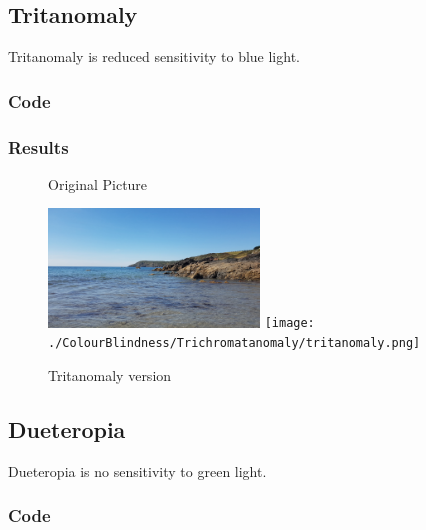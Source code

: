 \documentclass{Report}
\begin{document}
\newpage

\subsection{Tritanomaly}

Tritanomaly is reduced sensitivity to blue light. \autocites{Types}
\subsubsection{Code}


\newpage

\subsubsection{Results}
\begin{figure}[h!]
  \centering
  \caption{Original Picture}
  \includegraphics[width=0.5\textwidth]{Lizard}
  \centering
  \texttt{[image: ./ColourBlindness/Trichromatanomaly/tritanomaly.png]}
  \caption{Tritanomaly version}
\end{figure}

\newpage

\subsection{Dueteropia}

Dueteropia is no sensitivity to green light. \autocites{Types}
\subsubsection{Code}


\newpage
\end{document}
